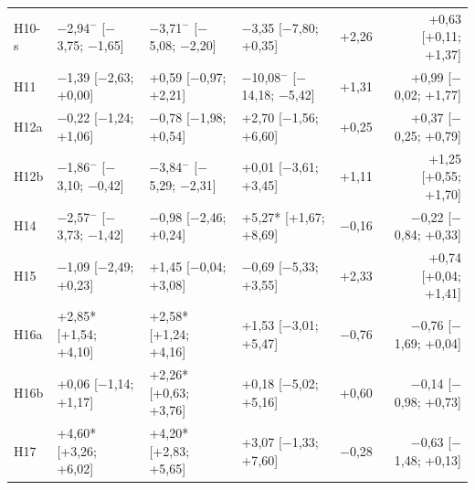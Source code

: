 \begin{table}[H]
\begin{tabular}{@{}l lll rr@{}}
H10-s & $-$2{,}94$^-$ [$-$3{,}75; $-$1{,}65] & $-$3{,}71$^-$ [$-$5{,}08; $-$2{,}20] & $-$3{,}35 [$-$7{,}80; +0{,}35] & +2{,}26 & +0{,}63 [+0{,}11; +1{,}37] \\
H11 & $-$1{,}39 [$-$2{,}63; +0{,}00] & +0{,}59 [$-$0{,}97; +2{,}21] & $-$10{,}08$^-$ [$-$14{,}18; $-$5{,}42] & +1{,}31 & +0{,}99 [$-$0{,}02; +1{,}77] \\
H12a & $-$0{,}22 [$-$1{,}24; +1{,}06] & $-$0{,}78 [$-$1{,}98; +0{,}54] & +2{,}70 [$-$1{,}56; +6{,}60] & +0{,}25 & +0{,}37 [$-$0{,}25; +0{,}79] \\
H12b & $-$1{,}86$^-$ [$-$3{,}10; $-$0{,}42] & $-$3{,}84$^-$ [$-$5{,}29; $-$2{,}31] & +0{,}01 [$-$3{,}61; +3{,}45] & +1{,}11 & +1{,}25 [+0{,}55; +1{,}70] \\
H14 & $-$2{,}57$^-$ [$-$3{,}73; $-$1{,}42] & $-$0{,}98 [$-$2{,}46; +0{,}24] & +5{,}27* [+1{,}67; +8{,}69] & $-$0{,}16 & $-$0{,}22 [$-$0{,}84; +0{,}33] \\
H15 & $-$1{,}09 [$-$2{,}49; +0{,}23] & +1{,}45 [$-$0{,}04; +3{,}08] & $-$0{,}69 [$-$5{,}33; +3{,}55] & +2{,}33 & +0{,}74 [+0{,}04; +1{,}41] \\
H16a & +2{,}85* [+1{,}54; +4{,}10] & +2{,}58* [+1{,}24; +4{,}16] & +1{,}53 [$-$3{,}01; +5{,}47] & $-$0{,}76 & $-$0{,}76 [$-$1{,}69; +0{,}04] \\
H16b & +0{,}06 [$-$1{,}14; +1{,}17] & +2{,}26* [+0{,}63; +3{,}76] & +0{,}18 [$-$5{,}02; +5{,}16] & +0{,}60 & $-$0{,}14 [$-$0{,}98; +0{,}73] \\
H17 & +4{,}60* [+3{,}26; +6{,}02] & +4{,}20* [+2{,}83; +5{,}65] & +3{,}07 [$-$1{,}33; +7{,}60] & $-$0{,}28 & $-$0{,}63 [$-$1{,}48; +0{,}13] \\
\bottomrule\end{tabular}\end{table}

